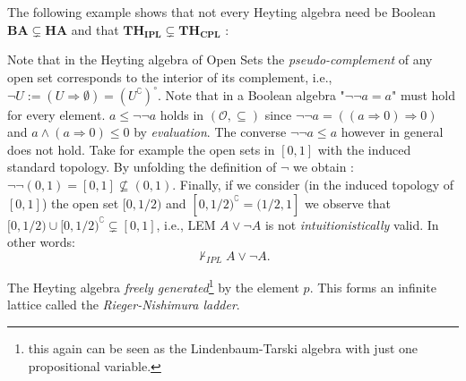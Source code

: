 The following example shows that not every Heyting algebra need be Boolean   $\mathbf{BA} \subsetneq \mathbf{HA}$ and that 	$\textbf{TH}_\textbf{IPL} \subsetneq \textbf{TH}_\textbf{CPL}$ :

\begin{ex}
	Note that in the Heyting algebra of Open Sets the \emph{pseudo-complement} of any open set corresponds to the interior of its complement, i.e., $\neg U := (U \Rightarrow \emptyset) = (U^\complement)^\circ$. \newline
	Note that in a Boolean algebra "$\neg\neg a = a$" must hold for every element. \newline
	$a \leq \neg \neg a$ holds in $(\mathcal{O},\subseteq)$ since $\neg \neg a = ((a \Rightarrow 0) \Rightarrow 0)$ and $a \land (a \Rightarrow 0) \leq 0$ by \emph{evaluation}. \newline\newline
	The converse $\neg\neg a \leq a$ however in general does not hold.\newline
	Take for example the open sets in $[0,1]$ with the induced standard topology. \newline
	By unfolding the definition of $\neg$ we obtain : $\neg\neg (0,1) = [0,1] \nsubseteq (0,1)$.\newline\newline
	Finally, if we consider (in the induced topology of $[0,1]$)  the open set $[0,1/2)$ and  $[0,1/2)^\complement = (1/2,1]$ we observe that $[0,1/2) \cup [0,1/2)^\complement \subsetneq [0,1]$, i.e., \newline LEM $A \lor \neg A$ is not \emph{intuitionistically} valid. In other words:
	\begin{equation*}
		\nvdash_{IPL} A \lor \neg A.
	\end{equation*}
	 
\end{ex}
	
\begin{ex}[$free_1(H)$]
		The Heyting algebra \emph{freely generated}\footnote{this again can be seen as the Lindenbaum-Tarski algebra with just one propositional variable.} by the element $p$. \newline
		This forms an infinite lattice called the \emph{Rieger-Nishimura ladder}. 
	\end{ex} 
	
